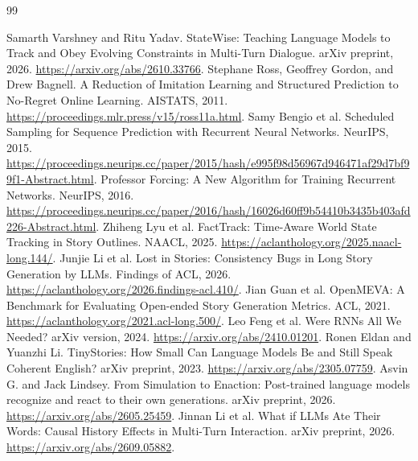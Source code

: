\begin{thebibliography}{99}
\raggedright
{} Samarth Varshney and Ritu Yadav. StateWise: Teaching Language Models to Track and Obey Evolving Constraints in Multi-Turn Dialogue. arXiv preprint, 2026.
\url{https://arxiv.org/abs/2610.33766}.
 Stephane Ross, Geoffrey Gordon, and Drew Bagnell. A Reduction of Imitation Learning and Structured Prediction to No-Regret Online Learning. AISTATS, 2011.
\url{https://proceedings.mlr.press/v15/ross11a.html}.
 Samy Bengio et al. Scheduled Sampling for Sequence Prediction with Recurrent Neural Networks. NeurIPS, 2015.
\url{https://proceedings.neurips.cc/paper/2015/hash/e995f98d56967d946471af29d7bf99f1-Abstract.html}.
 Professor Forcing: A New Algorithm for Training Recurrent Networks. NeurIPS, 2016.
\url{https://proceedings.neurips.cc/paper/2016/hash/16026d60ff9b54410b3435b403afd226-Abstract.html}.
 Zhiheng Lyu et al. FactTrack: Time-Aware World State Tracking in Story Outlines. NAACL, 2025.
\url{https://aclanthology.org/2025.naacl-long.144/}.
 Junjie Li et al. Lost in Stories: Consistency Bugs in Long Story Generation by LLMs. Findings of ACL, 2026.
\url{https://aclanthology.org/2026.findings-acl.410/}.
 Jian Guan et al. OpenMEVA: A Benchmark for Evaluating Open-ended Story Generation Metrics. ACL, 2021.
\url{https://aclanthology.org/2021.acl-long.500/}.
 Leo Feng et al. Were RNNs All We Needed? arXiv version, 2024.
\url{https://arxiv.org/abs/2410.01201}.
 Ronen Eldan and Yuanzhi Li. TinyStories: How Small Can Language Models Be and Still Speak Coherent English? arXiv preprint, 2023.
\url{https://arxiv.org/abs/2305.07759}.
 Asvin G. and Jack Lindsey. From Simulation to Enaction:
Post-trained language models recognize and react to their own generations.
arXiv preprint, 2026. \url{https://arxiv.org/abs/2605.25459}.
 Jinnan Li et al. What if LLMs Ate Their Words:
Causal History Effects in Multi-Turn Interaction. arXiv preprint, 2026.
\url{https://arxiv.org/abs/2609.05882}.
\end{thebibliography}
